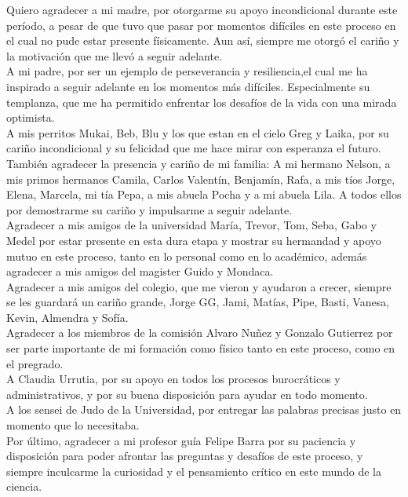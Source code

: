 \documentclass[
	spanish, %
	letterpaper, oneside
]{book}
\begin{document}
\begin{acknowledgments}
   Quiero agradecer a mi madre, por otorgarme su apoyo incondicional durante este período, a pesar de que tuvo que pasar por momentos difíciles en este proceso en el cual no pude estar presente físicamente. Aun así, siempre me otorgó el cariño y la motivación que me llevó a seguir adelante.  \\
   A mi padre, por ser un ejemplo de perseverancia y resiliencia,el cual me ha inspirado a seguir adelante en los momentos más difíciles. Especialmente su templanza, que me ha permitido enfrentar los desafíos de la vida con una mirada optimista. \\
   A mis perritos Mukai, Beb, Blu y los que estan en el cielo Greg y Laika, por su cariño incondicional y su felicidad que me hace mirar con esperanza el futuro.\\
   También agradecer la presencia  y cariño de mi familia: A mi hermano Nelson, a mis primos hermanos Camila, Carlos Valentín, Benjamín, Rafa, a mis tíos Jorge, Elena, Marcela, mi tía Pepa, a mis abuela Pocha y a mi abuela Lila. A todos ellos por demostrarme su cariño y impulsarme a seguir adelante. \\
   Agradecer a mis amigos de la universidad María, Trevor, Tom, Seba, Gabo y Medel por estar presente en esta dura etapa y mostrar su hermandad y apoyo mutuo en este proceso, tanto en lo personal como en lo académico, además agradecer a mis amigos del magister Guido y Mondaca.  \\
   Agradecer a mis amigos del colegio, que me vieron y ayudaron a crecer, siempre se les guardará un cariño grande, Jorge GG, Jami, Matías, Pipe, Basti, Vanesa, Kevin, Almendra y Sofía.  \\
   Agradecer a los miembros de la comisión Alvaro Nuñez y Gonzalo Gutierrez por ser parte importante de mi formación como físico tanto en este proceso, como en el pregrado.\\
   A Claudia Urrutia, por su apoyo en todos los procesos burocráticos y administrativos, y por su buena disposición para ayudar en todo momento. \\
   A los sensei de Judo de la Universidad, por entregar las palabras precisas justo en momento que lo necesitaba.\\
   Por último, agradecer a mi profesor guía Felipe Barra por su paciencia y disposición para poder afrontar las preguntas y desafíos de este proceso, y siempre inculcarme la curiosidad y el pensamiento crítico en este mundo de la ciencia. \\

\end{acknowledgments}

\templateIndex

\templateFinalcfg



\end{document}
